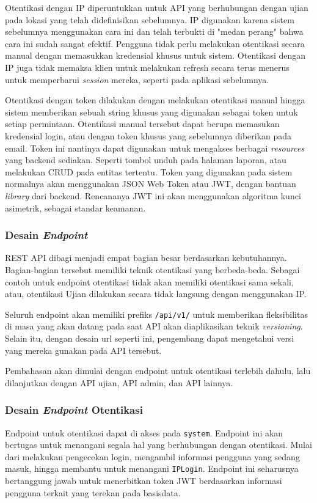     Otentikasi dengan IP diperuntukkan untuk API yang berhubungan dengan ujian
    pada lokasi yang telah didefinisikan sebelumnya. IP digunakan karena sistem
    sebelumnya menggunakan cara ini dan telah terbukti di "medan perang" bahwa
    cara ini sudah sangat efektif. Pengguna tidak perlu melakukan otentikasi
    secara manual dengan memasukkan kredensial khusus untuk sistem. Otentikasi
    dengan IP juga tidak memaksa klien untuk melakukan refresh secara terus
    menerus untuk memperbarui \textit{session} mereka, seperti pada aplikasi
    sebelumnya.
    
    Otentikasi dengan token dilakukan dengan melakukan otentikasi manual hingga
    sistem memberikan sebuah string khusus yang digunakan sebagai token untuk
    setiap permintaan. Otentikasi manual tersebut dapat berupa memasukan
    kredensial login, atau dengan token khusus yang sebelumnya diberikan pada
    email. Token ini nantinya dapat digunakan untuk mengakses berbagai
    \textit{resources} yang backend sediakan. Seperti tombol unduh pada halaman
    laporan, atau melakukan CRUD pada entitas tertentu. Token yang digunakan
    pada sistem normalnya akan menggunakan JSON Web Token atau JWT, dengan
    bantuan \textit{library} dari backend. Rencananya JWT ini akan menggunakan
    algoritma kunci asimetrik, sebagai standar keamanan.
    
\subsubsection{Desain \textit{Endpoint}} REST API dibagi menjadi empat bagian
    besar berdasarkan kebutuhannya. Bagian-bagian tersebut memiliki teknik
    otentikasi yang berbeda-beda. Sebagai contoh untuk endpoint otentikasi tidak
    akan memiliki otentikasi sama sekali, atau, otentikasi Ujian dilakukan
    secara tidak langsung dengan menggunakan IP. 
    
    Seluruh endpoint akan memiliki prefiks \texttt{/api/v1/} untuk memberikan
    fleksibilitas di masa yang akan datang pada saat API akan diaplikasikan
    teknik \textit{versioning}. Selain itu, dengan desain url seperti ini,
    pengembang dapat mengetahui versi yang mereka gunakan pada API tersebut.
    
    Pembahasan akan dimulai dengan endpoint untuk otentikasi terlebih dahulu,
    lalu dilanjutkan dengan API ujian, API admin, dan API lainnya.
    
\subsubsection{Desain \textit{Endpoint} Otentikasi} Endpoint untuk otentikasi
    dapat di akses pada \texttt{system}. Endpoint ini akan bertugas untuk
    menangani segala hal yang berhubungan dengan otentikasi. Mulai dari
    melakukan pengecekan login, mengambil informasi pengguna yang sedang masuk,
    hingga membantu untuk menangani \texttt{IPLogin}. Endpoint ini seharusnya
    bertanggung jawab untuk menerbitkan token JWT berdasarkan informasi pengguna
    terkait yang terekan pada basisdata.
    
